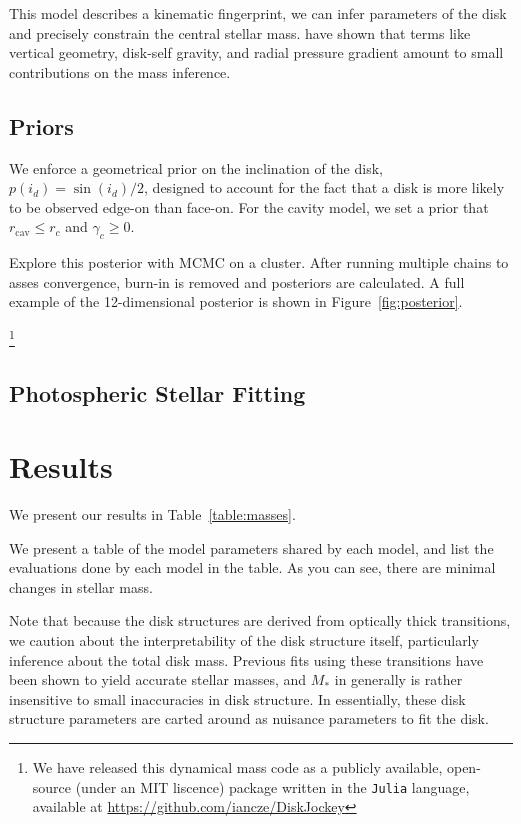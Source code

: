 \documentclass{aastex6}
\begin{document}
This model describes a kinematic fingerprint, we can infer parameters of the disk and precisely constrain the central stellar mass. \citet{rosenfeld13a} have shown that terms like vertical geometry, disk-self gravity, and radial pressure gradient amount to small contributions on the mass inference.







\subsection{Priors}

We enforce a geometrical prior on the inclination of the disk, $p(i_d) =  \sin(i_d)/2$, designed to account for the fact that a disk is more likely to be observed edge-on than face-on. For the cavity model, we set a prior that $r_\textrm{cav} \leq r_c$ and $\gamma_c \geq 0$.




Explore this posterior with MCMC on a cluster. After running multiple chains to asses convergence, burn-in is removed and posteriors are calculated. A full example of the 12-dimensional posterior is shown in Figure~\ref{fig:posterior}.


\footnote{We have released this dynamical mass code as a publicly available, open-source (under an MIT liscence) package written in the \texttt{Julia} language, available at \url{https://github.com/iancze/DiskJockey}}

\subsection{Photospheric Stellar Fitting}

\section{Results}

We present our results in Table~\ref{table:masses}.

We present a table of the model parameters shared by each model, and list the evaluations done by each model in the table. As you can see, there are minimal changes in stellar mass.

Note that because the disk structures are derived from optically thick transitions, we caution about the interpretability of the disk structure itself, particularly inference about the total disk mass. Previous fits using these transitions have been shown to yield accurate stellar masses, and $M_\ast$ in generally is rather insensitive to small inaccuracies in disk structure. In essentially, these disk structure parameters are carted around as nuisance parameters to fit the disk.
\end{document}
